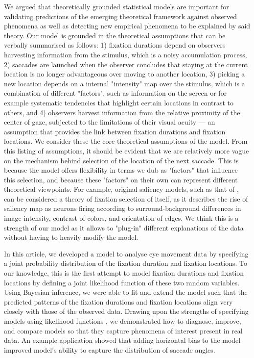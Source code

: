 \documentclass{article}
\begin{document}
We argued that theoretically grounded statistical models are important for validating predictions of the emerging theoretical framework against observed phenomena as well as detecting new empirical phenomena to be explained by said theory. Our model is grounded in the theoretical assumptions that can be verbally summarised as follows: 1) fixation durations depend on observers harvesting information from the stimulus, which is a noisy accumulation process, 2) saccades are launched when the observer concludes that staying at the current location is no longer advantageous over moving to another location, 3) picking a new location depends on a internal "intensity" map over the stimulus, which is a combination of different "factors", such as information on the screen or for example systematic tendencies that highlight certain locations in contrast to others, and 4) observers harvest information from the relative proximity of the center of gaze, subjected to the limitations of their visual acuity --- an assumption that provides the link between fixation durations and fixation locations. We consider these the core theoretical assumptions of the model. From this listing of assumptions, it should be evident that we are relatively more vague on the mechanism behind selection of the location of the next saccade. This is because the model offers flexibility in terms we dub as "factors" that influence this selection, and because these "factors" on their own can represent different theoretical viewpoints. For example, original saliency models, such as that of \citet{itti1998model}, can be considered a theory of fixation selection of itself, as it describes the rise of saliency map as neurons firing according to surround-background differences in image intensity, contrast of colors, and orientation of edges. We think this is a strength of our model as it allows to "plug-in" different explanations of the data without having to heavily modify the model.

In this article, we developed a model to analyse eye movement data by specifying a joint probability distribution of the fixation duration and fixation locations. To our knowledge, this is the first attempt to model fixation durations and fixation locations by defining a joint likelihood function of these two random variables. Using Bayesian inference, we were able to fit and extend the model such that the predicted patterns of the fixation durations and fixation locations align very closely with those of the observed data. Drawing upon the strengths of specifying models using likelihood functions \citep{schutt2017likelihood}, we demonstrated how to diagnose, improve, and compare models so that they capture phenomena of interest present in real data. An example application showed that adding horizontal bias to the model improved model's ability to capture the distribution of saccade angles.
\end{document}
